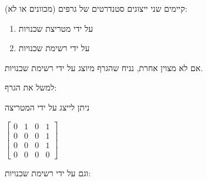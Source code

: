 קיימים שני ייצוגים סטנדרטים של גרפים (מכוונים או לא):
\begin{enumerate}
\item
על ידי מטריצת שכנויות
\item
על ידי רשימת שכנויות
\end{enumerate}
אם לא מצוין אחרת, נניח שהגרף מיוצג על ידי רשימת שכנויות.

למשל את הגרף:
\begin{center}
\end{center}
ניתן לייצג על ידי המטריצה 
\begin{center}
$
\begin{bmatrix}
0 & 1 & 0 & 1
\\
0 & 0 & 0 & 1
\\
0 & 0 & 0 & 1
\\
0 & 0 & 0 & 0
\end{bmatrix}
$
\end{center}
וגם על ידי רשימת שכנויות:
\begin{center}
\end{center}




